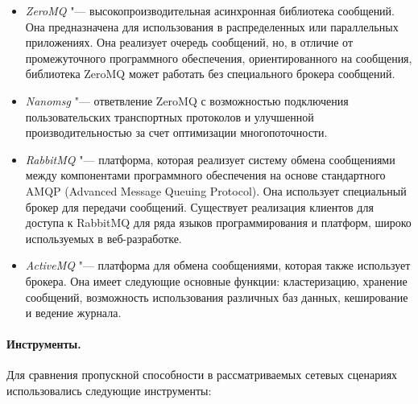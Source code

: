 \begin{itemize}
	\item \textit{ZeroMQ} "--- высокопроизводительная асинхронная библиотека сообщений. Она предназначена для использования в распределенных или параллельных приложениях. Она реализует очередь сообщений, но, в отличие от промежуточного программного обеспечения, ориентированного на сообщения, библиотека ZeroMQ может работать без специального брокера сообщений.
	\item \textit{Nanomsg} "--- ответвление ZeroMQ с возможностью подключения пользовательских транспортных протоколов и улучшенной производительностью за счет оптимизации многопоточности.
	\item \textit{RabbitMQ} "--- платформа, которая реализует систему обмена сообщениями между компонентами программного обеспечения на основе стандартного AMQP (Advanced Message Queuing Protocol). Она использует специальный брокер для передачи сообщений.
	Существует реализация клиентов для доступа к RabbitMQ для ряда языков программирования и платформ, широко используемых в веб-разработке.
	\item \textit{ActiveMQ} "--- платформа для обмена сообщениями, которая также использует брокера. Она имеет следующие основные функции: кластеризацию, хранение сообщений, возможность использования различных баз данных, кеширование и ведение журнала.
\end{itemize}

\paragraph{Инструменты.}

Для сравнения пропускной способности в рассматриваемых сетевых сценариях использовались следующие инструменты:

